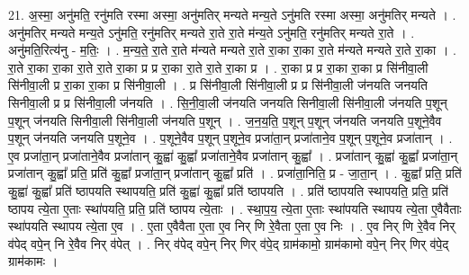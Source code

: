 \documentclass[17pt]{extarticle}
\begin{document}
21. अ॒स्मा॒ अनु॑मति॒ रनु॑मति रस्मा अस्मा॒ अनु॑मतिर् मन्यते मन्य॒ते ऽनु॑मति रस्मा अस्मा॒ अनु॑मतिर् मन्यते । . अनु॑मतिर् मन्यते मन्य॒ते ऽनु॑मति॒ रनु॑मतिर् मन्यते रा॒ते रा॒ते म॑न्य॒ते ऽनु॑मति॒ रनु॑मतिर् मन्यते रा॒ते । . अनु॑मति॒रित्य॑नु - म॒तिः॒ । . म॒न्य॒ते॒ रा॒ते रा॒ते म॑न्यते मन्यते रा॒ते रा॒का रा॒का रा॒ते म॑न्यते मन्यते रा॒ते रा॒का । . रा॒ते रा॒का रा॒का रा॒ते रा॒ते रा॒का प्र प्र रा॒का रा॒ते रा॒ते रा॒का प्र । . रा॒का प्र प्र रा॒का रा॒का प्र सि॑नीवा॒ली सि॑नीवा॒ली प्र रा॒का रा॒का प्र सि॑नीवा॒ली । . प्र सि॑नीवा॒ली सि॑नीवा॒ली प्र प्र सि॑नीवा॒ली ज॑नयति जनयति सिनीवा॒ली प्र प्र सि॑नीवा॒ली ज॑नयति । . सि॒नी॒वा॒ली ज॑नयति जनयति सिनीवा॒ली सि॑नीवा॒ली ज॑नयति प॒शून् प॒शून् ज॑नयति सिनीवा॒ली सि॑नीवा॒ली ज॑नयति प॒शून् । . ज॒न॒य॒ति॒ प॒शून् प॒शून् ज॑नयति जनयति प॒शूने॒वैव प॒शून् ज॑नयति जनयति प॒शूने॒व । . प॒शूने॒वैव प॒शून् प॒शूने॒व प्रजा॑ता॒न् प्रजा॑ताने॒व प॒शून् प॒शूने॒व प्रजा॑तान् । . ए॒व प्रजा॑ता॒न् प्रजा॑ताने॒वैव प्रजा॑तान् कु॒ह्वा॑ कु॒ह्वा᳚ प्रजा॑ताने॒वैव प्रजा॑तान् कु॒ह्वा᳚ । . प्रजा॑तान् कु॒ह्वा॑ कु॒ह्वा᳚ प्रजा॑ता॒न् प्रजा॑तान् कु॒ह्वा᳚ प्रति॒ प्रति॑ कु॒ह्वा᳚ प्रजा॑ता॒न् प्रजा॑तान् कु॒ह्वा᳚ प्रति॑ । . प्रजा॑ता॒निति॒ प्र - जा॒ता॒न् । . कु॒ह्वा᳚ प्रति॒ प्रति॑ कु॒ह्वा॑ कु॒ह्वा᳚ प्रति॑ ष्ठापयति स्थापयति॒ प्रति॑ कु॒ह्वा॑ कु॒ह्वा᳚ प्रति॑ ष्ठापयति । . प्रति॑ ष्ठापयति स्थापयति॒ प्रति॒ प्रति॑ ष्ठापय त्ये॒ता ए॒ताः स्था॑पयति॒ प्रति॒ प्रति॑ ष्ठापय त्ये॒ताः । . स्था॒प॒य॒ त्ये॒ता ए॒ताः स्था॑पयति स्थापय त्ये॒ता ए॒वैवैताः स्था॑पयति स्थापय त्ये॒ता ए॒व । . ए॒ता ए॒वैवैता ए॒ता ए॒व निर् णि रे॒वैता ए॒ता ए॒व निः । . ए॒व निर् णि रे॒वैव निर् व॑पेद् वपे॒न् नि रे॒वैव निर् व॑पेत् । . निर् व॑पेद् वपे॒न् निर् णिर् व॑पे॒द् ग्राम॑कामो॒ ग्राम॑कामो वपे॒न् निर् णिर् व॑पे॒द् ग्राम॑कामः । \newline
\end{document}

